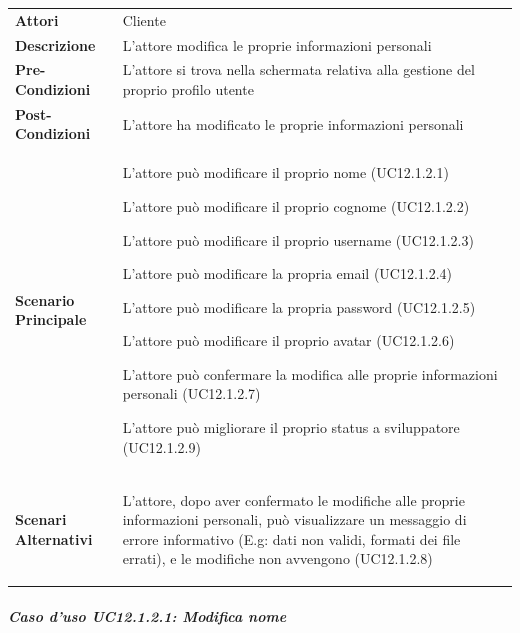 \begin{tabular}{ l | p{11cm}}
	\hline
	\rowcolor{Gray}
	\multicolumn{2}{c}{UC12.1.2 - Modifica informazioni personali} \\
	\hline
	\textbf{Attori} & Cliente \\
	\textbf{Descrizione} & L'attore modifica le proprie informazioni personali \\
	\textbf{Pre-Condizioni} & L'attore si trova nella schermata relativa alla gestione del proprio profilo utente \\
	\textbf{Post-Condizioni} & L'attore ha modificato le proprie informazioni personali \\
	\textbf{Scenario Principale} & 
	\begin{enumerate*}[label=(\arabic*.),itemjoin={\newline}]
		\item L'attore può modificare il proprio nome (UC12.1.2.1)
		\item L'attore può modificare il proprio cognome (UC12.1.2.2)
		\item L'attore può modificare il proprio username (UC12.1.2.3)
		\item L'attore può modificare la propria email (UC12.1.2.4)
		\item L'attore può modificare la propria password (UC12.1.2.5)
		\item L'attore può modificare il proprio avatar (UC12.1.2.6)
		\item L'attore può confermare la modifica alle proprie informazioni personali (UC12.1.2.7)
		\item L'attore può migliorare il proprio status a sviluppatore (UC12.1.2.9)
	\end{enumerate*}\\
	\textbf{Scenari Alternativi} & 
	\begin{enumerate*}[label=(\arabic*.),itemjoin={\newline}]
		\item L'attore, dopo aver confermato le modifiche alle proprie informazioni personali, può visualizzare un messaggio di errore informativo (E.g: dati non validi, formati dei file errati), e le modifiche non avvengono (UC12.1.2.8)
	\end{enumerate*}\\
\end{tabular}

\subparagraph{Caso d'uso UC12.1.2.1: Modifica nome}
\label{UC12_1_2_1}

